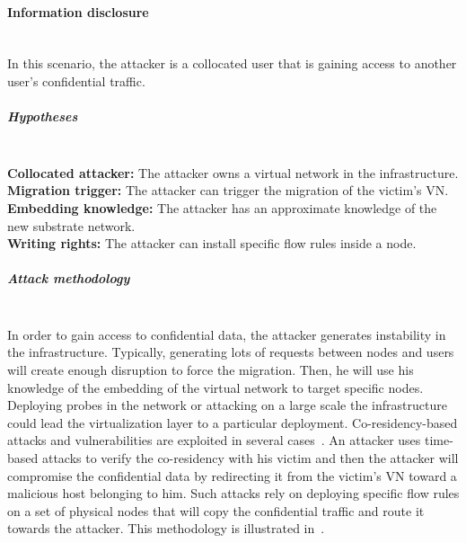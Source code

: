 \newpage
\paragraph{Information disclosure}\textbf{\\}
In this scenario, the attacker is a collocated user that is gaining access to another user's confidential traffic. 
\subparagraph{Hypotheses}\textbf{\\}
\textbf{Collocated attacker:} The attacker owns a virtual network in the infrastructure.\\
\textbf{Migration trigger:} The attacker can trigger the migration of the victim's VN.\\
\textbf{Embedding knowledge:} The attacker has an approximate knowledge of the new substrate network.\\
\textbf{Writing rights:} The attacker can install specific flow rules inside a node.

\subparagraph{Attack methodology}\textbf{\\}
In order to gain access to confidential data, the attacker generates instability in the infrastructure. Typically, generating lots of requests between nodes and users will create enough disruption to force the migration.
Then, he will use his knowledge of the embedding of the virtual network to target specific nodes.
Deploying probes in the network or attacking on a large scale the infrastructure could lead the virtualization layer to a particular deployment. Co-residency-based attacks and vulnerabilities are exploited in several cases~\cite{malicious-atya2017,nomad-Moon2015b,getoffmucloud-Ristenpart2009,stalling-atya2017}.
An attacker uses time-based attacks to verify the co-residency with his victim and then the attacker will compromise the confidential data by redirecting it from the victim's VN toward a malicious host belonging to him.
Such attacks rely on deploying specific flow rules on a set of physical nodes that will copy the confidential traffic and route it towards the attacker.
This methodology is illustrated in~\cite{Costa2015,Sphinx-Dhawan2015}.


